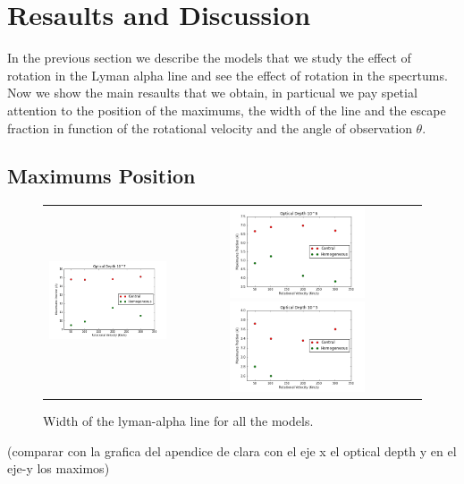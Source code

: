 \documentclass{article}
\theoremstyle{definition}
\theoremstyle{remark}
\begin{document}



\section*{Resaults and Discussion}
\label{sec:Results_ly_Rotation}


In the previous section we describe the models that we study the
effect of rotation in the Lyman alpha line and see the effect of
rotation in the specrtums. Now we show the main resaults that we
obtain, in particual we pay spetial attention to the position of the
maximums, the width of the line and the escape fraction in function of
the rotational velocity and the angle of observation $\theta$.  

\subsection*{Maximums Position}

\begin{figure}[H]

  \centering

  \label{figur}\caption{Width of the lyman-alpha line for all the models. }

  \begin{tabular}{cc}

    
    \includegraphics[width=40mm]{0maximum7t.png}&

    \includegraphics[width=40mm]{0maximum6t.png}

    \includegraphics[width=40mm]{0maximum5t.png}

   \end{tabular}

\end{figure}
(comparar con la grafica del apendice de clara con el eje x el optical
depth y en el eje-y los maximos) 
\end{document}
